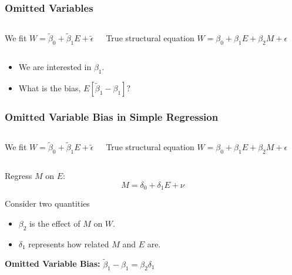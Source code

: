 \documentclass[12pt, block=fill]{beamer}
\begin{document}
\begin{frame}
  \frametitle{Omitted Variables}

    \begin{columns}[t]
    \begin{block}{We fit}
   \vspace{.1cm}        $ W  = \tilde{\beta}_0 + \tilde{\beta}_1  E + \tilde \epsilon$
    \end{block}
    \begin{block}{True structural equation}
  \vspace{.2cm}     $W = \beta_0 + \beta_1 E + \beta_2 M + \epsilon$
    \end{block}
    \end{columns}
    \vspace{1cm}
    
  \begin{itemize}
  \item We are interested in $\beta_1$.
  \item What is the bias, $E[\tilde \beta_1 - \beta_1]$?
  \end{itemize} 
\end{frame}

\begin{frame}[t]
  \frametitle{Omitted Variable Bias in Simple Regression}
    \begin{columns}[t]
    \begin{block}{We fit}
   \vspace{.1cm}        $ W  = \tilde{\beta}_0 + \tilde{\beta}_1  E + \tilde \epsilon$
    \end{block}
    \begin{block}{True structural equation}
  \vspace{.2cm}     $W = \beta_0 + \beta_1 E + \beta_2 M + \epsilon$
    \end{block}
    \end{columns}
%    

Regress $M$ on $E$:
$$M = \delta_0 + \delta_1 E + \nu$$

Consider two quantities
\begin{itemize}
\item $\beta_2$ is the effect of $M$ on $W$.
\item $\delta_1$ represents how related $M$ and $E$ are.
\end{itemize}

 \textbf{Omitted Variable Bias:} $ \tilde{\beta}_{1}  - \beta_{1} = \beta_{2} \delta_{1} $
\end{frame}
\end{document}
